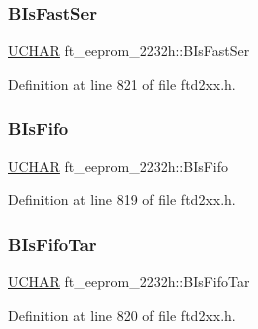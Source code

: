 \subsubsection{\texorpdfstring{B\+Is\+Fast\+Ser}{BIsFastSer}}
{\footnotesize\ttfamily \hyperlink{CatCaloProto40MHz_2inc_2WinTypes_8h_a4f4bb67531a9bf6f0b9c6ad76aeba587}{U\+C\+H\+AR} ft\+\_\+eeprom\+\_\+2232h\+::\+B\+Is\+Fast\+Ser}



Definition at line 821 of file ftd2xx.\+h.

\mbox{\label{structft__eeprom__2232h_a967db8f183ffb34000282afa58f5fd0a}} 
\subsubsection{\texorpdfstring{B\+Is\+Fifo}{BIsFifo}}
{\footnotesize\ttfamily \hyperlink{CatCaloProto40MHz_2inc_2WinTypes_8h_a4f4bb67531a9bf6f0b9c6ad76aeba587}{U\+C\+H\+AR} ft\+\_\+eeprom\+\_\+2232h\+::\+B\+Is\+Fifo}



Definition at line 819 of file ftd2xx.\+h.

\mbox{\label{structft__eeprom__2232h_a88d403ec9e1b8bdb88160fd3b3129191}} 
\subsubsection{\texorpdfstring{B\+Is\+Fifo\+Tar}{BIsFifoTar}}
{\footnotesize\ttfamily \hyperlink{CatCaloProto40MHz_2inc_2WinTypes_8h_a4f4bb67531a9bf6f0b9c6ad76aeba587}{U\+C\+H\+AR} ft\+\_\+eeprom\+\_\+2232h\+::\+B\+Is\+Fifo\+Tar}



Definition at line 820 of file ftd2xx.\+h.

\mbox{\label{structft__eeprom__2232h_a964876406798f7c704764488c04b1530}} 
